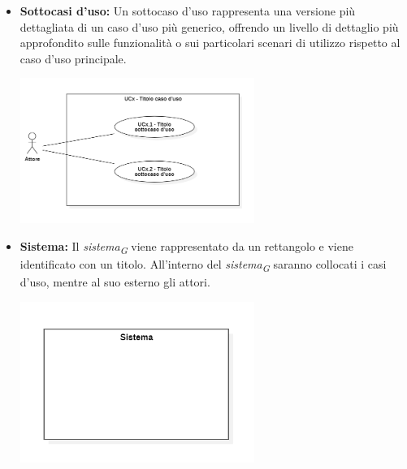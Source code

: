 \begin{itemize}
    \item \textbf{Sottocasi d'uso:}
    Un sottocaso d'uso rappresenta una versione più dettagliata di un caso d'uso più generico, offrendo un livello di dettaglio più approfondito sulle funzionalità o sui particolari scenari di utilizzo rispetto al caso d'uso principale.
    \begin{minipage}[t]{\linewidth}
        \centering
        \includegraphics[width=0.6\textwidth]{../Images/NormeDiProgetto/SottocasoD'Uso.PNG}
    \end{minipage}

    \item \textbf{Sistema:}
    Il \textit{sistema}\textsubscript{\textit{G}} viene rappresentato da un rettangolo e viene identificato con un titolo. All'interno del \textit{sistema}\textsubscript{\textit{G}} saranno collocati i casi d'uso, mentre al suo esterno gli attori.
    \begin{minipage}[t]{\linewidth}
        \centering
        \includegraphics[width=0.6\textwidth]{../Images/NormeDiProgetto/Sistema.PNG}
    \end{minipage}


\end{itemize}
